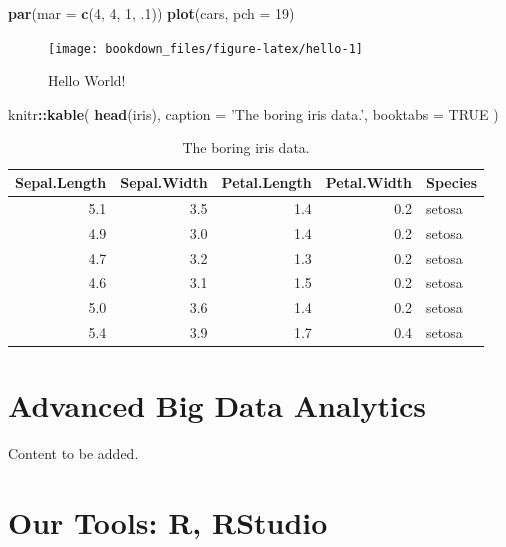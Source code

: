 \documentclass[]{krantz}
\makeatletter
\newenvironment{Shaded}{\begin{snugshade}}{\end{snugshade}}
\newcommand{\KeywordTok}[1]{\textcolor[rgb]{0.27,0.27,0.27}{\textbf{#1}}}
\newcommand{\DataTypeTok}[1]{\textcolor[rgb]{0.27,0.27,0.27}{#1}}
\newcommand{\DecValTok}[1]{\textcolor[rgb]{0.06,0.06,0.06}{#1}}
\newcommand{\StringTok}[1]{\textcolor[rgb]{0.5,0.5,0.5}{#1}}
\newcommand{\OtherTok}[1]{\textcolor[rgb]{0.56,0.35,0.01}{#1}}
\newcommand{\OperatorTok}[1]{\textcolor[rgb]{0.81,0.36,0.00}{\textbf{#1}}}
\newcommand{\NormalTok}[1]{#1}
\newenvironment{kframe}{%
\medskip{}
\setlength{\fboxsep}{.8em}
 \def\at@end@of@kframe{}%
 \ifinner\ifhmode%
  \def\at@end@of@kframe{\end{minipage}}%
  \begin{minipage}{\columnwidth}%
 \fi\fi%
 \def\FrameCommand##1{\hskip\@totalleftmargin \hskip-\fboxsep
 \colorbox{shadecolor}{##1}\hskip-\fboxsep
     \hskip-\linewidth \hskip-\@totalleftmargin \hskip\columnwidth}%
 \MakeFramed {\advance\hsize-\width
   \@totalleftmargin\z@ \linewidth\hsize
   \@setminipage}}%
 {\par\unskip\endMakeFramed%
 \at@end@of@kframe}
\renewenvironment{Shaded}{\begin{kframe}}{\end{kframe}}
\theoremstyle{definition}
\theoremstyle{definition}
\theoremstyle{definition}
\theoremstyle{remark}
\makeatother
\begin{document}
\begin{Shaded}
\begin{Highlighting}[]
\KeywordTok{par}\NormalTok{(}\DataTypeTok{mar =} \KeywordTok{c}\NormalTok{(}\DecValTok{4}\NormalTok{, }\DecValTok{4}\NormalTok{, }\DecValTok{1}\NormalTok{, .}\DecValTok{1}\NormalTok{))}
\KeywordTok{plot}\NormalTok{(cars, }\DataTypeTok{pch =} \DecValTok{19}\NormalTok{)}
\end{Highlighting}
\end{Shaded}

\begin{figure}
\texttt{[image: bookdown\_files/figure-latex/hello-1]} \caption{Hello World!}\label{fig:hello}
\end{figure}

\begin{Shaded}
\begin{Highlighting}[]
\NormalTok{knitr}\OperatorTok{::}\KeywordTok{kable}\NormalTok{(}
  \KeywordTok{head}\NormalTok{(iris), }\DataTypeTok{caption =} \StringTok{'The boring iris data.'}\NormalTok{,}
  \DataTypeTok{booktabs =} \OtherTok{TRUE}
\NormalTok{)}
\end{Highlighting}
\end{Shaded}

\begin{table}

\caption{\label{tab:iris}The boring iris data.}
\centering
\begin{tabular}[t]{rrrrl}
\toprule
Sepal.Length & Sepal.Width & Petal.Length & Petal.Width & Species\\
\midrule
5.1 & 3.5 & 1.4 & 0.2 & setosa\\
4.9 & 3.0 & 1.4 & 0.2 & setosa\\
4.7 & 3.2 & 1.3 & 0.2 & setosa\\
4.6 & 3.1 & 1.5 & 0.2 & setosa\\
5.0 & 3.6 & 1.4 & 0.2 & setosa\\
5.4 & 3.9 & 1.7 & 0.4 & setosa\\
\bottomrule
\end{tabular}
\end{table}

\chapter{Advanced Big Data Analytics}\label{advanced-big-data-analytics}

Content to be added.

\chapter{Our Tools: R, RStudio}\label{our-tools-r-rstudio}
\end{document}

